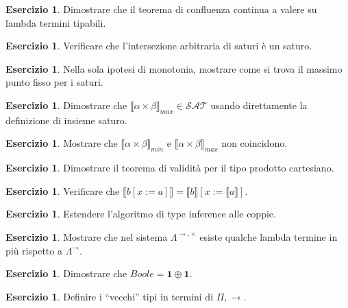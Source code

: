 \documentclass[oneside]{amsart}
\numberwithin{equation}{section}
\numberwithin{figure}{section}
\theoremstyle{plain}
\theoremstyle{definition}
\newtheorem{xca}[thm]{Esercizio}
\begin{document}
\begin{xca}
Dimostrare che il teorema di confluenza continua a valere su lambda termini tipabili.
\end{xca}

\begin{xca}
Verificare che l'intersezione arbitraria di saturi è un saturo.
\end{xca}

\begin{xca}
Nella sola ipotesi di monotonia, mostrare come si trova il massimo
punto fisso per i saturi.
\end{xca}

\begin{xca}
Dimostrare che $\llbracket\alpha\times\beta\rrbracket_{max} \in \mathcal{SAT}$
usando direttamente la definizione di insieme saturo.
\end{xca}

\begin{xca}
Mostrare che $\llbracket\alpha\times\beta\rrbracket_{min}$ e
$\llbracket\alpha\times\beta\rrbracket_{max}$ non coincidono.
\end{xca}

\begin{xca}
Dimostrare il teorema di validità per il tipo prodotto cartesiano.
\end{xca}

\begin{xca}
Verificare che $\llbracket b[x:=a] \rrbracket = \llbracket b\rrbracket[x:=\llbracket a\rrbracket]$.
\end{xca}

\begin{xca}
Estendere l'algoritmo di type inference alle coppie.
\end{xca}

\begin{xca}
Mostrare che nel sistema $\Lambda^{\rightarrow,\times}$ esiste qualche lambda termine
in più rispetto a $\Lambda^{\rightarrow}$.
\end{xca}

\begin{xca}
Dimostrare che $Boole = \mathbf{1}\oplus\mathbf{1}$.
\end{xca}

\begin{xca}
Definire i ``vecchi'' tipi in termini di $\Pi,\rightarrow$.
\end{xca}
\end{document}
